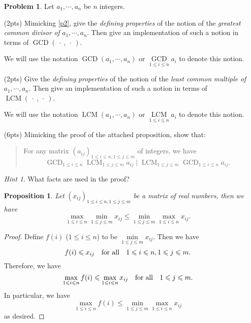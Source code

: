 \documentclass[11pt]{article}
\theoremstyle{plain}
\newtheorem*{propstar}{Proposition}
\theoremstyle{definition}
\newtheorem{problem}{Problem}
\theoremstyle{remark}
\newtheorem*{hint}{Hint}
\numberwithin{equation}{problem}
\DeclareMathOperator*\GCD{GCD}
\DeclareMathOperator*\LCM{LCM}
\begin{document}
\begin{problem}
	Let $a_1,\cdots,a_n$ be $n$ integers. 
	\begin{listinprob}
		\item (2pts) Mimicking \cref{p2}, give the \emph{defining properties} of the notion of the \emph{greatest common divisor of $a_1,\cdots,a_n$}. Then give an implementation of such a notion in terms of $\GCD(\:\cdot\:,\:\cdot\:)$. 
		
		We will use the notation $\GCD(a_1,\cdots,a_n)$ or $\GCD\limits_{1\le i\le n}a_i$ to denote this notion.
		\item (2pts) Give the \emph{defining properties} of the notion of the \emph{least common multiple of $a_1,\cdots,a_n$}. Then give an implementation of such a notion in terms of $\LCM(\:\cdot\:,\:\cdot\:)$. 
		
		We will use the notation $\LCM(a_1,\cdots,a_n)$ or $\LCM\limits_{1\le i\le n}a_i$ to denote this notion.

		\item (6pts) Mimicking the proof of the attached proposition, show that: 
		\begin{quote}
			For any matrix $(a_{ij})_{1\le i\le n, 1\le j\le m}$ of integers, we have 
			\[
				\GCD_{1\le i\le n}\LCM_{1\le j\le m} a_{ij} \mid 
				\LCM_{1\le j\le m}\GCD_{1\le i\le n} a_{ij}.
			\]
		\end{quote}
		\begin{hint}
			What facts are used in the proof?
		\end{hint}
	\end{listinprob}
	\begin{tcolorbox}
		\begin{propstar}\label{prop}
			Let $(x_{ij})_{1\le i\le n, 1\le j\le m}$ be a matrix of real numbers, then we have 
			\[
				\max_{1\le i\le n}\min_{1\le j\le m} x_{ij} \le 
				\min_{1\le j\le m}\max_{1\le i\le n} x_{ij}.
			\]
		\end{propstar}
		\begin{proof}
			Define $f(i)$ ($1\le i\le n$) to be $\min\limits_{1\le j\le m}x_{ij}$. Then we have 
			\[
				f(i) \leqslant x_{ij} \quad\text{for all}\quad 1\leqslant i\leqslant n, 1\leqslant j\leqslant m.
			\]
			Therefore, we have 
			\[
				\max_{1\leqslant i\leqslant n}f(i) \leqslant \max_{1\leqslant i\leqslant n} x_{ij} 
				\quad\text{for all}\quad 1\leqslant j\leqslant m.
			\]
			In particular, we have 
			\[
				\max_{1\le i\le n}f(i) \le \min_{1\le j\le m}\max_{1\le i\le n} x_{ij}
			\]
			as desired.
		\end{proof}
	\end{tcolorbox}
\end{problem}
\end{document}
